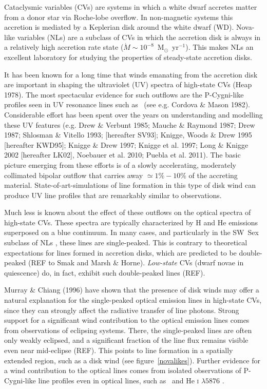 \documentclass[preprint, a4paper, 11pt]{aastex}
\begin{document}
Cataclysmic variables (CVs) are systems in which a white dwarf
accretes matter from a donor star via Roche-lobe overflow. In
non-magnetic systems this accretion is mediated by a Keplerian disk
around the white dwarf (WD). Nova-like variables (NLs) are a subclass
of CVs in which the accretion disk is always in a relatively
high accretion rate state ($\dot{M} \sim
10^{-8}$~M$_{\odot}$~yr$^{-1}$).  This makes NLs an excellent
laboratory for studying the properties of steady-state accretion
disks.

It has been known for a long time that winds emanating from the
accretion disk are important in shaping the ultraviolet (UV) spectra
of high-state CVs (Heap 1978). The most spectacular evidence for such
outflows are the P-Cygni-like profiles seen in UV resonance lines such as
\civfull\ (see e.g. Cordova \& Mason
1982\nocite{cordova1982}). Considerable effort has been spent over the
years on understanding and modelling these UV features (e.g. Drew \&
Verbunt 1985; Mauche \& Raymond
1987; Drew 1987; Shlosman \& Vitello 1993; [hereafter
SV93]\nocite{SV93}; Knigge, Woods \& Drew 1995 [hereafter
KWD95]\nocite{KWD95}; Knigge \& Drew 1997; Knigge et al. 1997; Long \&
Knigge 2002 [hereafter LK02]\nocite{LK02}, Noebauer et al. 2010;
Puebla et al. 2011). The basic picture emerging from these efforts is
of a slowly accelerating, moderately collimated bipolar
outflow that carries away $\simeq 1\% - 10\%$ of the accreting
material. State-of-art-simulations of line formation in this type
of disk wind can produce UV line profiles that are remarkably similar
to observations.

Much less is known about the effect of these outflows on the optical
spectra of high-state CVs. These spectra are typically characterized
by H and He emissions superposed on a blue continuum. In many
cases, and particularly in the SW~Sex subclass of NLs
\citep{HSK86,DR95}, these lines are single-peaked. This is contrary to
theoretical expectations for lines formed in accretion disks, which
are predicted to be double-peaked (REF to Smak and Marsh \&
Horne). {\em Low-state} CVs (dwarf novae in quiescence) do, in fact,
exhibit such double-peaked lines (REF). 

Murray \& Chiang (1996) have shown that the presence of disk winds may
offer a natural explanation for the single-peaked optical emission lines in
high-state CVs, since they can strongly affect the radiative transfer
of line photons. Strong support for a significant wind contribution to the
optical emission lines comes from observations of eclipsing
systems. There, the single-peaked lines are often only weakly
eclipsed, and a significant fraction of the line flux remains visible
even near mid-eclipse (REF). This points to line formation in a spatially
extended region, such as a disk wind (see figure~\ref{novalikes}).
Further evidence for a wind contribution to the optical lines comes
from isolated observations of P-Cygni-like line profiles even in optical
lines, such as \ha\ and He \textsc{i} $\lambda5876$ \citep{RN98}.
\end{document}
